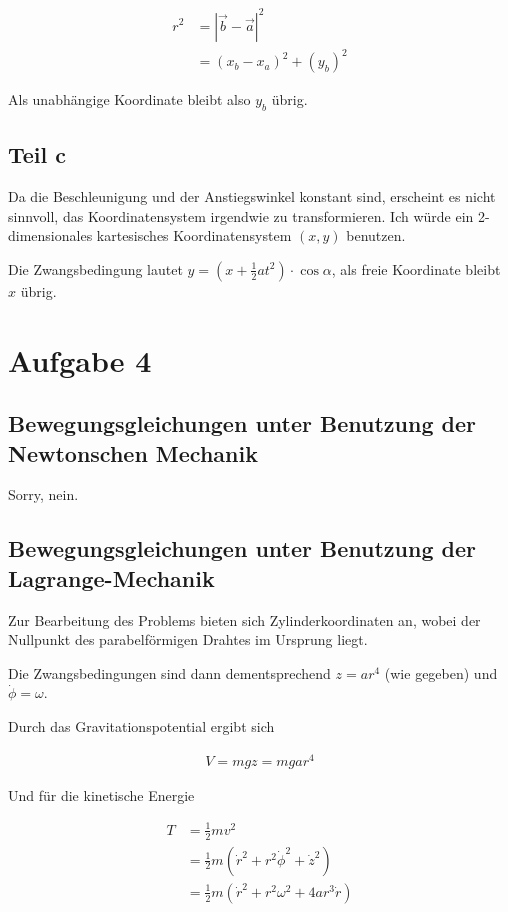 \documentclass[a4paper,german,12pt,smallheadings]{scrartcl}
\begin{document}
\begin{align*}
  r^2 &= |\vec{b} - \vec{a}|^2 \\
    &= (x_b-x_a)^2 + (y_b)^2
\end{align*}

Als unabhängige Koordinate bleibt also $y_b$ übrig.


\subsection*{Teil c}
Da die Beschleunigung und der Anstiegswinkel konstant sind, erscheint es nicht
sinnvoll, das Koordinatensystem irgendwie zu transformieren. Ich würde ein
2-dimensionales kartesisches Koordinatensystem $(x, y)$ benutzen.

Die Zwangsbedingung lautet $y = (x + \frac{1}{2}at^2) \cdot \cos \alpha$, als
freie Koordinate bleibt $x$ übrig.

\section*{Aufgabe 4}

\subsection*{Bewegungsgleichungen unter Benutzung der Newtonschen Mechanik}

Sorry, nein.

\subsection*{Bewegungsgleichungen unter Benutzung der Lagrange-Mechanik}

Zur Bearbeitung des Problems bieten sich Zylinderkoordinaten an, wobei der
Nullpunkt des parabelförmigen Drahtes im Ursprung liegt.

Die Zwangsbedingungen sind dann dementsprechend $z=ar^4$ (wie gegeben) und
$\dot{\phi} = \omega$.

Durch das Gravitationspotential ergibt sich

\begin{align*}
  V = mgz = mgar^4
\end{align*}

Und für die kinetische Energie

\begin{align*}
  T &= \frac{1}{2}mv^2 \\
    &= \frac{1}{2}m(\dot{r}^2 + r^2\dot{\phi}^2 + \dot{z}^2) \\
    &= \frac{1}{2}m(\dot{r}^2 + r^2\omega^2 + 4ar^3\dot{r})
\end{align*}
\end{document}
